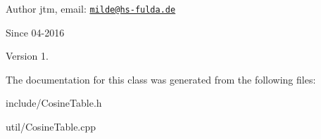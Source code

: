 \begin{DoxyAuthor}{Author}
jtm, email\-:  \href{mailto:milde@hs-fulda.de}{\tt milde@hs-\/fulda.\-de} 
\end{DoxyAuthor}
\begin{DoxySince}{Since}
04-\/2016 
\end{DoxySince}
\begin{DoxyVersion}{Version}
1. 
\end{DoxyVersion}


The documentation for this class was generated from the following files\-:\begin{DoxyCompactItemize}
\item 
include/Cosine\-Table.\-h\item 
util/Cosine\-Table.\-cpp\end{DoxyCompactItemize}
